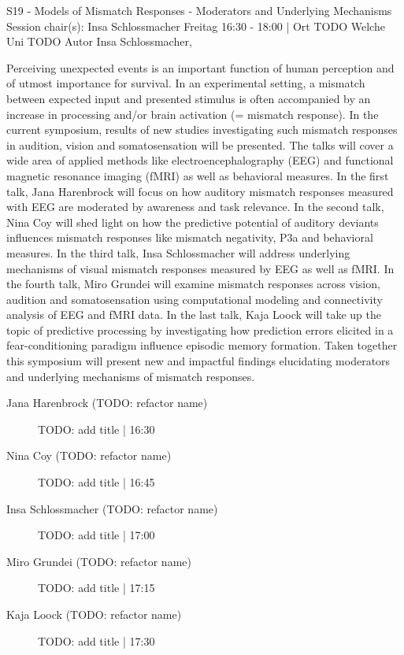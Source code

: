 
            \begin{symposium}
            {S19 - Models of Mismatch Responses - Moderators and Underlying Mechanisms}
            {Session chair(s): Insa Schlossmacher}
            {Freitag 16:30 - 18:00 | Ort TODO}
            {Welche Uni TODO}
            Autor Insa Schlossmacher, 

Perceiving unexpected events is an important function of human perception and of utmost importance for survival. In an experimental setting, a mismatch between expected input and presented stimulus is often accompanied by an increase in processing and/or brain activation (= mismatch response). In the current symposium, results of new studies investigating such mismatch responses in audition, vision and somatosensation will be presented. The talks will cover a wide area of applied methods like electroencephalography (EEG) and functional magnetic resonance imaging (fMRI) as well as behavioral measures. In the first talk, Jana Harenbrock will focus on how auditory mismatch responses measured with EEG are moderated by awareness and task relevance. In the second talk, Nina Coy will shed light on how the predictive potential of auditory deviants influences mismatch responses like mismatch negativity, P3a and behavioral measures. In the third talk, Insa Schlossmacher will address underlying mechanisms of visual mismatch responses measured by EEG as well as fMRI. In the fourth talk, Miro Grundei will examine mismatch responses across vision, audition and somatosensation using computational modeling and connectivity analysis of EEG and fMRI data. In the last talk, Kaja Loock will take up the topic of predictive processing by investigating how prediction errors elicited in a fear-conditioning paradigm influence episodic memory formation. Taken together this symposium will present new and impactful findings elucidating moderators and underlying mechanisms of mismatch responses.
            \begin{description}    
            
                \item [Jana Harenbrock (TODO: refactor name)] TODO: add title \textcolor{mygray}{ | 16:30}    
                
                \item [Nina Coy (TODO: refactor name)] TODO: add title \textcolor{mygray}{ | 16:45}    
                
                \item [Insa Schlossmacher (TODO: refactor name)] TODO: add title \textcolor{mygray}{ | 17:00}    
                
                \item [Miro Grundei (TODO: refactor name)] TODO: add title \textcolor{mygray}{ | 17:15}    
                
                \item [Kaja Loock (TODO: refactor name)] TODO: add title \textcolor{mygray}{ | 17:30}    
                
            \end{description} 
            \end{symposium}
            